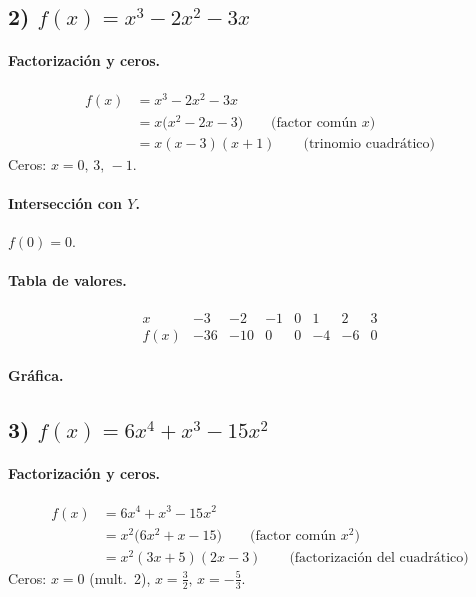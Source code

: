 \documentclass[12pt,a4paper]{article}
\begin{document}
	\bigskip
	
	\subsection*{2) \(f(x)=x^{3}-2x^{2}-3x\)}
	\paragraph{Factorización y ceros.}
	\begin{align*}
		f(x) &= x^{3}-2x^{2}-3x\\
		&= x\bigl(x^{2}-2x-3\bigr) \qquad \text{(factor común \(x\))}\\
		&= x(x-3)(x+1) \qquad \text{(trinomio cuadrático)}
	\end{align*}
	Ceros: \(x=0,\,3,\,-1\).
	
	\paragraph{Intersección con \(Y\).} \(f(0)=0\).
	
	\paragraph{Tabla de valores.}
	\[
	\begin{array}{c|rrrrrrr}
		x & -3 & -2 & -1 & 0 & 1 & 2 & 3\\\hline
		f(x) & -36 & -10 & 0 & 0 & -4 & -6 & 0
	\end{array}
	\]
	
	\paragraph{Gráfica.}
	
	\bigskip
	
	\subsection*{3) \(f(x)=6x^{4}+x^{3}-15x^{2}\)}
	\paragraph{Factorización y ceros.}
	\begin{align*}
		f(x) &= 6x^{4}+x^{3}-15x^{2}\\
		&= x^{2}\bigl(6x^{2}+x-15\bigr) \qquad \text{(factor común \(x^2\))}\\
		&= x^{2}(3x+5)(2x-3) \qquad \text{(factorización del cuadrático)}
	\end{align*}
	Ceros: \(x=0\) (mult.\ 2), \(x=\tfrac{3}{2},\,x=-\tfrac{5}{3}\).
	
\end{document}
